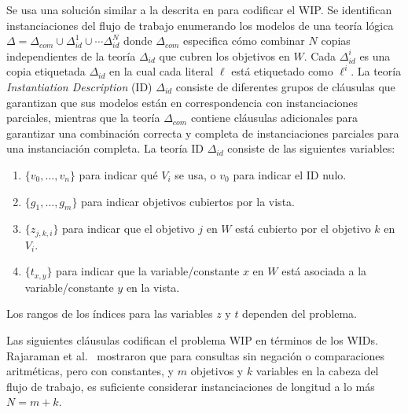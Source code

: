 Se usa una solución similar a la descrita en
\cite{arvelo:aaai06} para codificar el WIP. 
Se identifican instanciaciones del flujo de trabajo enumerando los modelos de
una teoría lógica
$\Delta=\Delta_{com}\cup\Delta_{id}^1\cup\cdots\Delta_{id}^N$
donde $\Delta_{com}$ especifica cómo combinar $N$ copias independientes de la teoría
$\Delta_{id}$ que cubren los objetivos en $W$.
Cada $\Delta^i_{id}$ es una copia etiquetada $\Delta_{id}$ en la cual cada
literal 
$\ell$ está etiquetado como $\ell^i$.
La teoría \emph{Instantiation Description} (ID) $\Delta_{id}$ consiste de
diferentes grupos de cláusulas que garantizan que sus modelos están en
correspondencia con instanciaciones parciales, mientras que la teoría
$\Delta_{com}$ contiene cláusulas adicionales para garantizar una combinación
correcta y completa de instanciaciones parciales para una instanciación
completa.
La teoría ID $\Delta_{id}$ consiste de las siguientes variables:

\begin{enumerate}[--]
\item $\{v_0,\ldots,v_n\}$ para indicar qué $V_i$ se usa, o $v_0$ para indicar el ID nulo.
\item $\{g_1,\ldots,g_m\}$ para indicar objetivos cubiertos por la vista.
\item $\{z_{j,k,i}\}$ para indicar que el objetivo $j$ en $W$ está cubierto por el objetivo $k$ en $V_i$.
\item $\{t_{x,y}\}$ para indicar que la variable/constante $x$ en $W$ está asociada a la variable/constante $y$ en la vista.
\end{enumerate}

Los rangos de los índices para las variables $z$ y $t$ dependen del problema.

Las siguientes cláusulas codifican el problema WIP en términos de los WIDs.
Rajaraman et al.\ \cite{RajaramanSU95} mostraron que para consultas sin negación
o comparaciones aritméticas, pero con constantes, y $m$ objetivos y $k$
variables en la cabeza del flujo de trabajo, es suficiente considerar
instanciaciones de longitud a lo más $N=m+k$.

